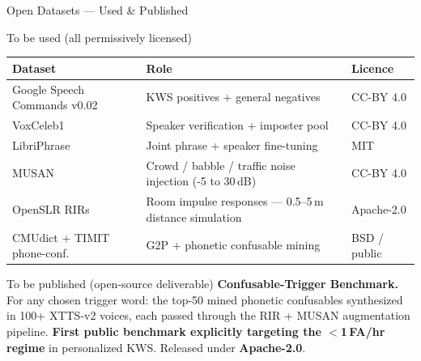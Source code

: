 \documentclass[aspectratio=169,10pt]{beamer}
\newcommand{\novel}[1]{\textcolor{srigold}{\textbf{#1}}}
\begin{document}
\begin{frame}{Open Datasets — Used \& Published}
  \small
  \begin{block}{To be used (all permissively licensed)}
    \centering
    \begin{tabular}{@{}p{3.5cm}p{7.5cm}p{2.0cm}@{}}
      \toprule
      \textbf{Dataset} & \textbf{Role} & \textbf{Licence} \\
      \midrule
      Google Speech Commands v0.02 & KWS positives + general negatives & CC-BY 4.0 \\
      VoxCeleb1                    & Speaker verification + imposter pool & CC-BY 4.0 \\
      LibriPhrase                  & Joint phrase + speaker fine-tuning & MIT \\
      MUSAN                        & Crowd / babble / traffic noise injection (-5 to 30\,dB) & CC-BY 4.0 \\
      OpenSLR RIRs                 & Room impulse responses — 0.5--5\,m distance simulation & Apache-2.0 \\
      CMUdict + TIMIT phone-conf.  & G2P + phonetic confusable mining & BSD / public \\
      \bottomrule
    \end{tabular}
  \end{block}
  \begin{block}{\color{srigold}To be published (open-source deliverable)}
    \textbf{Confusable-Trigger Benchmark.} For any chosen trigger word: the top-50 mined phonetic confusables synthesized in 100+ XTTS-v2 voices, each passed through the RIR + MUSAN augmentation pipeline. \novel{First public benchmark explicitly targeting the $<$1\,FA/hr regime} in personalized KWS. Released under \textbf{Apache-2.0}.
  \end{block}
\end{frame}
\end{document}
